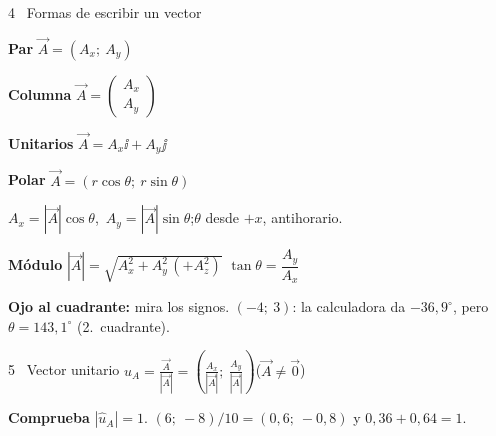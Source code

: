 \documentclass[10pt,a4paper]{article}
\newcommand{\lbl}[1]{\textbf{\textcolor{Ink}{#1}}\enspace}
\begin{document}
\begin{minipage}[t]{0.322\linewidth}
\vspace{0pt}
\begin{vecbox}{4 \textperiodcentered\ Formas de escribir un vector}
\begin{minipage}[c]{0.56\linewidth}
\raggedright
\lbl{Par} $\vec A=(A_x;\ A_y)$\par
\lbl{Columna} $\vec A=\begin{pmatrix}A_x\\A_y\end{pmatrix}$\par
\lbl{Unitarios} $\vec A=A_x\ii+A_y\jj$\par
\lbl{Polar} $\vec A=(r\cos\theta;\ r\sin\theta)$
\end{minipage}\hfill
\begin{minipage}[c]{0.42\linewidth}
\centering
{}
\end{minipage}\par\vspace{0.2em}
$A_x=|\vec A|\cos\theta$,\ $A_y=|\vec A|\sin\theta$;\enspace $\theta$ desde $+x$, antihorario.\par
\lbl{M\'odulo} $|\vec A|=\sqrt{A_x^2+A_y^2\,(+A_z^2)}$\qquad
$\tan\theta=\dfrac{A_y}{A_x}$\par
\textcolor{AmberLine!70!black}{\textbf{Ojo al cuadrante:}} mira los signos.
$(-4;\ 3)$: la calculadora da $-36{,}9^\circ$, pero $\theta=143{,}1^\circ$ (2.\textordmasculine\ cuadrante).
\end{vecbox}

\begin{vecbox}{5 \textperiodcentered\ Vector unitario}
$\displaystyle\hat u_A=\frac{\vec A}{|\vec A|}
=\left(\frac{A_x}{|\vec A|};\ \frac{A_y}{|\vec A|}\right)$\quad ($\vec A\ne\vec 0$)\par
\lbl{Comprueba} $|\hat u_A|=1$.\enspace
$(6;\ -8)/10=(0{,}6;\ -0{,}8)$ y $0{,}36+0{,}64=1$.
\end{vecbox}


\end{minipage}
\end{document}
